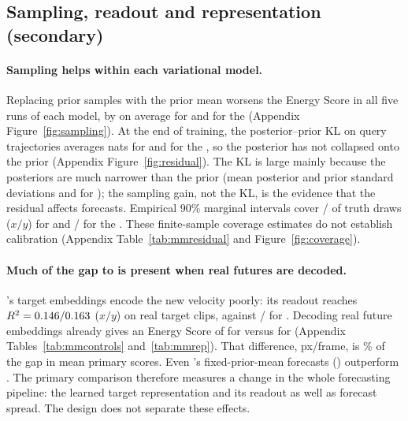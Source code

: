 \subsection{Sampling, readout and representation (secondary)}

\paragraph{Sampling helps within each variational model.} Replacing prior samples with the prior mean worsens the Energy Score in all five runs of each model, by \VMMSOneSamplingGain{} on average for \shvar{} and \VMMROneSamplingGain{} for the \emavar{} (Appendix Figure~\ref{fig:sampling}). At the end of training, the posterior--prior KL on query trajectories averages \VMMSOneKL{} nats for \shvar{} and \VMMROneKL{} for the \emavar{}, so the posterior has not collapsed onto the prior (Appendix Figure~\ref{fig:residual}). The KL is large mainly because the posteriors are much narrower than the prior (mean posterior and prior standard deviations \VMMSOnePostStd{} and \VMMSOnePriorStd{} for \shvar{}); the sampling gain, not the KL, is the evidence that the residual affects forecasts. Empirical 90\% marginal intervals cover \VMMSOneCoverX{}/\VMMSOneCoverY{} of truth draws ($x/y$) for \shvar{} and \VMMROneCoverX{}/\VMMROneCoverY{} for the \emavar{}. These finite-sample coverage estimates do not establish calibration (Appendix Table~\ref{tab:mmresidual} and Figure~\ref{fig:coverage}).

\paragraph{Much of the gap to \shdet{} is present when real futures are decoded.} \shdet{}'s target embeddings encode the new velocity poorly: its readout reaches $R^2=0.146/0.163$ ($x/y$) on real target clips, against \VMMSOneReadoutRtwoX/\VMMSOneReadoutRtwoY{} for \shvar{}. Decoding real future embeddings already gives an Energy Score of \VMMSZeroOracleED{} for \shdet{} versus \VMMSOneOracleED{} for \shvar{} (Appendix Tables~\ref{tab:mmcontrols} and~\ref{tab:mmrep}). That difference, \VMMOracleGapSZeroSOne{} px/frame, is \VMMOracleGapShare\% of the gap in mean primary scores. Even \shvar{}'s fixed-prior-mean forecasts (\VMMSOneFixedMean) outperform \shdet{}. The primary comparison therefore measures a change in the whole forecasting pipeline: the learned target representation and its readout as well as forecast spread. The design does not separate these effects.

